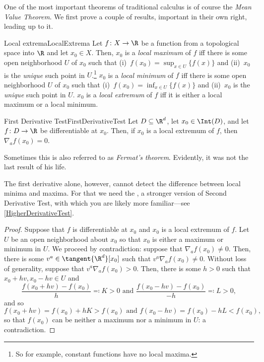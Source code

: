 One of the most important theorems of traditional calculus is of course the \emph{Mean Value Theorem}.  We first prove a couple of results, important in their own right, leading up to it.
\begin{dfn}{Local extrema}{LocalExtrema}
Let $f\colon X\rightarrow \R$ be a function from a topological space into $\R$ and let $x_0\in X$.  Then, $x_0$ is a \emph{local maximum} of $f$ iff there is some open neighborhood $U$ of $x_0$ such that (i)~$f(x_0)=\sup _{x\in U}\{ f(x)\}$ and (ii)~$x_0$ is the \emph{unique} such point in $U$.\footnote{So for example, constant functions have no local maxima.}  $x_0$ is a \emph{local minimum} of $f$ iff there is some open neighborhood $U$ of $x_0$ such that (i)~$f(x_0)=\inf _{x\in U}\{ f(x)\}$ and (ii)~$x_0$ is the \emph{unique} such point in $U$.  $x_0$ is a \emph{local extremum} of $f$ iff it is either a local maximum or a local minimum.
\end{dfn}
\begin{prp}{First Derivative Test}{FirstDerivativeTest}
Let $D\subseteq \R ^d$, let $x_0\in \Int (D)$, and let $f\colon D\rightarrow \R$ be differentiable at $x_0$.  Then, if $x_0$ is a local extremum of $f$, then $\nabla _af(x_0)=0$.
\begin{rmk}
Sometimes this is also referred to as \emph{Fermat's theorem}.  Evidently, it was not the last result of his life.
\end{rmk}
\begin{rmk}
The first derivative alone, however, cannot detect the difference between local minima and maxima.  For that we need the \emph{}, a stronger version of Second Derivative Test, with which you are likely more familiar---see \cref{HigherDerivativeTest}.
\end{rmk}
\begin{proof}
Suppose that $f$ is differentiable at $x_0$ and $x_0$ is a local extremum of $f$.  Let $U$ be an open neighborhood about $x_0$ so that $x_0$ is either a maximum or minimum in $U$.  We proceed by contradiction:  suppose that $\nabla _af(x_0)\neq 0$.  Then, there is some $v^a\in \tangent{\R ^d}[x_0]$ such that $v^a\nabla _af(x_0)\neq 0$.  Without loss of generality, suppose that $v^a\nabla _af(x_0)>0$.  Then, there is some $h>0$ such that $x_0+hv,x_0-hv\in U$ and
\begin{equation}
\frac{f(x_0+hv)-f(x_0)}{h}\eqqcolon K>0\text{ and }\frac{f(x_0-hv)-f(x_0)}{-h}\eqqcolon L>0,
\end{equation}
and so
\begin{equation}
f(x_0+hv)=f(x_0)+hK>f(x_0)\text{ and }f(x_0-hv)=f(x_0)-hL<f(x_0),
\end{equation}
so that $f(x_0)$ can be neither a maximum nor a minimum in $U$:  a contradiction.
\end{proof}
\end{prp}
